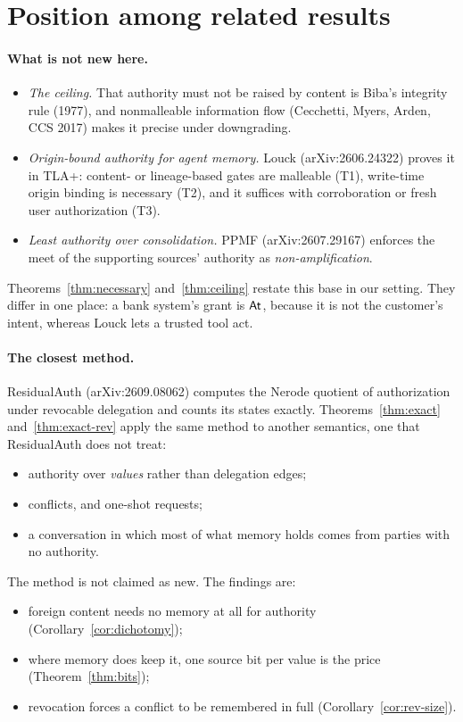 \section{Position among related results}\label{sec:related}

\paragraph{What is not new here.}
\begin{itemize}
\item \emph{The ceiling.} That authority must not be raised by content is Biba's integrity rule
  (1977), and nonmalleable information flow (Cecchetti, Myers, Arden, CCS 2017) makes it precise
  under downgrading.
\item \emph{Origin-bound authority for agent memory.} Louck (arXiv:2606.24322) proves it in TLA+:
  content- or lineage-based gates are malleable (T1), write-time origin binding is necessary (T2),
  and it suffices with corroboration or fresh user authorization (T3).
\item \emph{Least authority over consolidation.} PPMF (arXiv:2607.29167) enforces the meet of the
  supporting sources' authority as \emph{non-amplification}.
\end{itemize}
Theorems~\ref{thm:necessary} and~\ref{thm:ceiling} restate this base in our setting. They
differ in one place: a bank system's grant is $\mathsf{At}$, because it is not the customer's intent,
whereas Louck lets a trusted tool act.

\paragraph{The closest method.} ResidualAuth (arXiv:2609.08062) computes the Nerode quotient of
authorization under revocable delegation and counts its states exactly. Theorems~\ref{thm:exact}
and~\ref{thm:exact-rev} apply the same method to another semantics, one that ResidualAuth does
not treat:
\begin{itemize}
\item authority over \emph{values} rather than delegation edges;
\item conflicts, and one-shot requests;
\item a conversation in which most of what memory holds comes from parties with no authority.
\end{itemize}
The method is not claimed as new. The findings are:
\begin{itemize}
\item foreign content needs no memory at all for authority (Corollary~\ref{cor:dichotomy});
\item where memory does keep it, one source bit per value is the price (Theorem~\ref{thm:bits});
\item revocation forces a conflict to be remembered in full (Corollary~\ref{cor:rev-size}).
\end{itemize}

